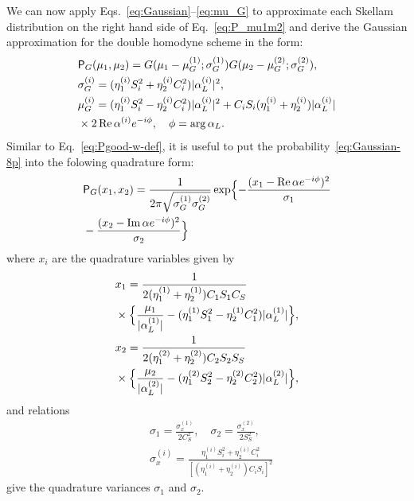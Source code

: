\documentclass[%
reprint,
superscriptaddress,
 amsmath,amssymb,amsfonts,
 aps,
 pra,
 longbibliography
]{revtex4-2}
\renewcommand{\Re}{\mathop{\rm Re}\nolimits}
\renewcommand{\Im}{\mathop{\rm Im}\nolimits}
\newcommand{\prob}{\mathsf{P}}
\begin{document}
We can now apply Eqs.~\eqref{eq:Gaussian}--\eqref{eq:mu_G}
to approximate each Skellam distribution on
the right hand side of Eq.~\eqref{eq:P_mu1m2}
and derive the Gaussian approximation
for the double homodyne scheme in the form:
\begin{align}
  &
  \label{eq:Gaussian-8p}
    \prob_G(\mu_1,\mu_2)=G(\mu_1-\mu_G^{(1)};\sigma_G^{(1)})G(\mu_2-\mu_G^{(2)};\sigma_G^{(2)}),
    \\
  &
    \label{eq:sigma_G-i}
    \sigma_G^{(i)}=
    (\eta_1^{(i)}S_i^2+\eta_2^{(i)}C_i^2) |\alpha_L^{(i)}|^2,
  \\
  &
    \label{eq:mu_G-i}
    \mu_G^{(i)}=
    (\eta_1^{(i)}S_i^2-\eta_2^{(i)}C_i^2) |\alpha_L^{(i)}|^2
    +C_iS_i (\eta_1^{(i)}+\eta_2^{(i)})|\alpha_L^{(i)}| 
    \notag
  \\
  &
    \times
    2\Re\alpha^{(i)} e^{-i\phi},\quad \phi=\arg\alpha_L.
\end{align}
Similar to Eq.~\eqref{eq:Pgood-w-def},
it is useful to put
the probability~\eqref{eq:Gaussian-8p}
into the folowing quadrature form:
\begin{align}
  \label{eq:P_G-x1x2}
  &
    \prob_G(x_1,x_2)=\frac{1}{2\pi\sqrt{\sigma_G^{(1)}\sigma_G^{(2)}}}
    \exp\Bigl\{
    -\frac{(x_1-\Re\alpha e^{-i\phi})^2}{\sigma_1}
    \notag
  \\
  &
    -\frac{(x_2-\Im\alpha e^{-i\phi})^2}{\sigma_2}
    \Bigr\}
\end{align}
where $x_i$ are the quadrature variables given by
\begin{align}
  &
  \label{eq:x-1}
  x_1=
  \frac{1}{2(\eta_1^{(1)}+\eta_2^{(1)})C_1S_1C_S}
  \notag
  \\
  &
    \times
  \Bigl\{
  \frac{\mu_1}{|\alpha_L^{(1)}|}-(\eta_1^{(1)}S_1^2-\eta_2^{(1)}C_1^2) |\alpha_L^{(1)}|
    \Bigr\},
  \\
  &
  \label{eq:x-2}
  x_2=
  \frac{1}{2(\eta_1^{(2)}+\eta_2^{(2)})C_2S_2S_S}
  \notag
  \\
  &
    \times
  \Bigl\{
  \frac{\mu_2}{|\alpha_L^{(2)}|}-(\eta_1^{(2)}S_2^2-\eta_2^{(2)}C_2^2) |\alpha_L^{(2)}|
    \Bigr\},
\end{align}
and relations
\begin{align}
  &
  \label{eq:sigm-i}
    \sigma_1=\frac{\sigma_x^{(1)}}{ 2 C_S^2},
    \quad
    \sigma_2=\frac{\sigma_x^{(2)}}{ 2 S_S^2},
  \\
  &
    \label{eq:sigm-x-i}
    \sigma_x^{(i)}=\frac{\eta_1^{(i)}S_i^2+\eta_2^{(i)}C_i^2}{
    \left[(\eta_1^{(i)}+\eta_2^{(i)})C_iS_i\right]^2
    }
\end{align}
give the quadrature variances $\sigma_1$ and $\sigma_2$.
\end{document}
